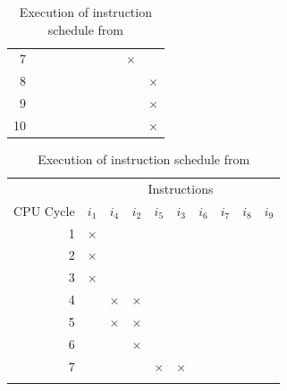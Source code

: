 \begin{table}
\begin{subtable}{0.48\textwidth}
\begin{tabular}{rccccccccc}
             7 &   &   &   &   &   &   &   &$\boldsymbol{\times}$&   \\ \rowcolor[gray]{.975}
             8 &   &   &   &   &   &   &   &   &$\boldsymbol{\times}$\\
             9 &   &   &   &   &   &   &   &   &$\boldsymbol{\times}$\\ \rowcolor[gray]{.975}
            10 &   &   &   &   &   &   &   &   &$\boldsymbol{\times}$\\
            \bottomrule
        \end{tabular}
        \caption{Execution of instruction schedule from }
        \label{tbl:bg:schedule-comparison-a}
    \end{subtable}
    \hfill
    \begin{subtable}{0.48\textwidth}
        \begin{tabular}{rccccccccc} \toprule
            & \multicolumn{9}{c}{\fontsize{11pt}{9pt}\selectfont Instructions} \\
            \cmidrule{2-10}
            {\fontsize{11pt}{9pt}\selectfont CPU Cycle} & 
            {\fontsize{11pt}{9pt}\selectfont $i_1$} & 
            {\fontsize{11pt}{9pt}\selectfont $i_4$} & 
            {\fontsize{11pt}{9pt}\selectfont $i_2$} & 
            {\fontsize{11pt}{9pt}\selectfont $i_5$} & 
            {\fontsize{11pt}{9pt}\selectfont $i_3$} & 
            {\fontsize{11pt}{9pt}\selectfont $i_6$} & 
            {\fontsize{11pt}{9pt}\selectfont $i_7$} & 
            {\fontsize{11pt}{9pt}\selectfont $i_8$} & 
            {\fontsize{11pt}{9pt}\selectfont $i_9$} \\
            \midrule
             1 &$\boldsymbol{\times}$&   &   &   &   &   &   &   &   \\ \rowcolor[gray]{.975}
             2 &$\boldsymbol{\times}$&   &   &   &   &   &   &   &   \\
             3 &$\boldsymbol{\times}$&   &   &   &   &   &   &   &   \\ \rowcolor[gray]{.975}
             4 &   &$\boldsymbol{\times}$&$\boldsymbol{\times}$&   &   &   &   &   &   \\
             5 &   &$\boldsymbol{\times}$&$\boldsymbol{\times}$&   &   &   &   &   &   \\ \rowcolor[gray]{.975}
             6 &   &   &$\boldsymbol{\times}$&   &   &   &   &   &   \\
             7 &   &   &   &$\boldsymbol{\times}$&$\boldsymbol{\times}$&   &   &   &   \\ \rowcolor[gray]{.975}

\end{tabular}
\end{subtable}
\end{table}
